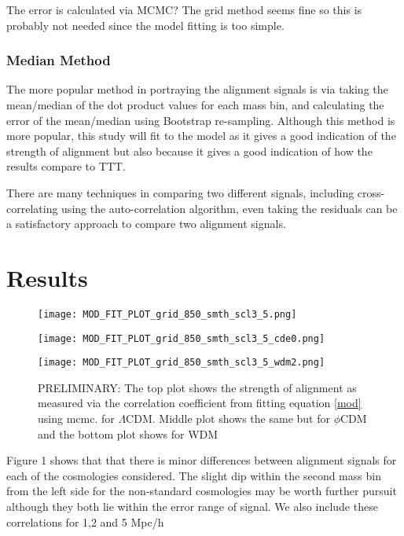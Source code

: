 \documentclass[a4paper,fleqn,usenatbib]{mnras}
\def \qcdm{$\phi$CDM }
\begin{document}
The error is calculated via MCMC? The grid method seems fine so this is probably not needed since the model fitting is too simple.
\subsubsection{Median Method}
The more popular method in portraying the alignment signals is via taking the mean/median of the dot product values for each mass bin, and calculating the error of the mean/median using Bootstrap re-sampling. Although this method is more popular, this study will fit to the model as it gives a good indication of the strength of alignment but also because it gives a good indication of how the results compare to TTT.

There are many techniques in comparing two different signals, including cross-correlating using the auto-correlation algorithm, even taking the residuals can be a satisfactory approach to compare two alignment signals.

\section{Results}\label{results}
 
\begin{figure}
\centering
\texttt{[image: MOD\_FIT\_PLOT\_grid\_850\_smth\_scl3\_5.png]}
\label{cor_fig} 
\end{figure}
\begin{figure}
\centering
\texttt{[image: MOD\_FIT\_PLOT\_grid\_850\_smth\_scl3\_5\_cde0.png]}\label{cor_fig_cde0} 

\end{figure}
\begin{figure}
\centering
\texttt{[image: MOD\_FIT\_PLOT\_grid\_850\_smth\_scl3\_5\_wdm2.png]}\label{cor_fig_wdm2} 
\caption{PRELIMINARY: The top plot shows the strength of alignment as measured via the correlation coefficient from fitting equation \ref{mod} using mcmc. for $\Lambda$CDM. Middle plot shows the same but for \qcdm and the bottom plot shows for WDM}
\end{figure}
Figure 1 shows that that there is minor differences between alignment signals for each of the cosmologies considered. The slight dip within the second mass bin from the left side for the non-standard cosmologies may be worth further pursuit although they both lie within the error range of \citet{Trowland_13} signal. We also include these correlations for 1,2 and 5 Mpc/h
\end{document}
